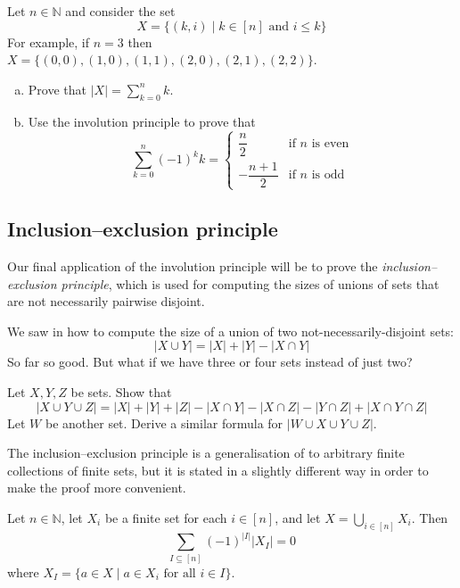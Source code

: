 \begin{exercise}
Let $n \in \mathbb{N}$ and consider the set
\[ X = \{ (k,i) \mid k \in [n] \text{ and } i \le k \} \]
For example, if $n=3$ then $X = \{ (0,0), (1,0), (1,1), (2,0), (2,1), (2,2) \}$.

\begin{enumerate}[(a)]
\item Prove that $|X| = \displaystyle \sum_{k=0}^n k$.
\item Use the involution principle to prove that
\[ \sum_{k=0}^n (-1)^k k = \begin{cases} \dfrac{n}{2} & \text{if $n$ is even} \\ -\dfrac{n+1}{2} & \text{if $n$ is odd } \end{cases} \]
\end{enumerate}
\end{exercise}

\subsection*{Inclusion--exclusion principle}

Our final application of the involution principle will be to prove the \textit{inclusion--exclusion principle}, which is used for computing the sizes of unions of sets that are not necessarily pairwise disjoint.

We saw in  how to compute the size of a union of two not-necessarily-disjoint sets:
\[ |X \cup Y| = |X| + |Y| - |X \cap Y| \]
So far so good. But what if we have three or four sets instead of just two?

\begin{exercise}
\label{exSizeOfUnionOf3Or4Sets}
Let $X,Y,Z$ be sets. Show that
\[ |X \cup Y \cup Z| = |X| + |Y| + |Z| - |X \cap Y| - |X \cap Z| - |Y \cap Z| + |X \cap Y \cap Z| \]
Let $W$ be another set. Derive a similar formula for $|W \cup X \cup Y \cup Z|$.
\end{exercise}

The inclusion--exclusion principle is a generalisation of  to arbitrary finite collections of finite sets, but it is stated in a slightly different way in order to make the proof more convenient.

\begin{theorem}
\label{thmInclusionExclusion}
Let $n \in \mathbb{N}$, let $X_i$ be a finite set for each $i \in [n]$, and let $X = \displaystyle \bigcup_{i \in [n]} X_i$. Then
\[ \sum_{I \subseteq [n]} (-1)^{|I|} |X_I| = 0 \]
where $X_I = \{ a \in X \mid a \in X_i \text{ for all } i \in I \}$. 
\end{theorem}

